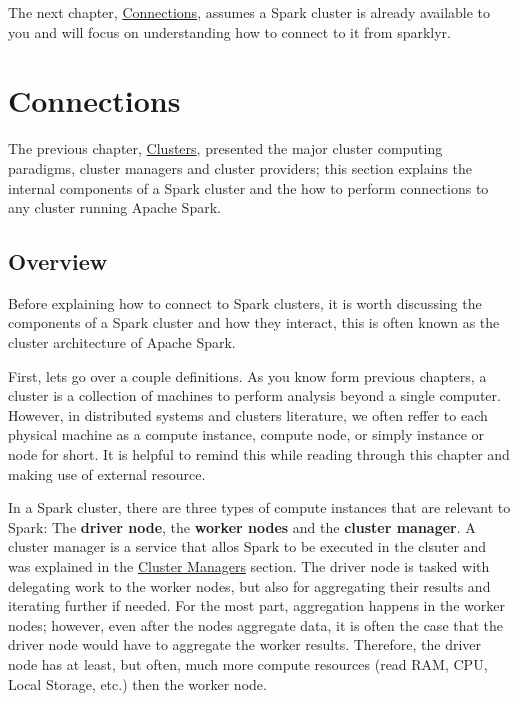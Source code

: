 \documentclass[]{book}
\theoremstyle{definition}
\theoremstyle{definition}
\theoremstyle{definition}
\theoremstyle{remark}
\begin{document}
The next chapter, \protect\hyperlink{connections-1}{Connections},
assumes a Spark cluster is already available to you and will focus on
understanding how to connect to it from sparklyr.

\hypertarget{connections}{%
\chapter{Connections}\label{connections}}

The previous chapter, \protect\hyperlink{clusters}{Clusters}, presented
the major cluster computing paradigms, cluster managers and cluster
providers; this section explains the internal components of a Spark
cluster and the how to perform connections to any cluster running Apache
Spark.

\hypertarget{overview-2}{%
\section{Overview}\label{overview-2}}

Before explaining how to connect to Spark clusters, it is worth
discussing the components of a Spark cluster and how they interact, this
is often known as the cluster architecture of Apache Spark.

First, lets go over a couple definitions. As you know form previous
chapters, a cluster is a collection of machines to perform analysis
beyond a single computer. However, in distributed systems and clusters
literature, we often reffer to each physical machine as a compute
instance, compute node, or simply instance or node for short. It is
helpful to remind this while reading through this chapter and making use
of external resource.

In a Spark cluster, there are three types of compute instances that are
relevant to Spark: The \textbf{driver node}, the \textbf{worker nodes}
and the \textbf{cluster manager}. A cluster manager is a service that
allos Spark to be executed in the clsuter and was explained in the
\href{Managers}{Cluster Managers} section. The driver node is tasked
with delegating work to the worker nodes, but also for aggregating their
results and iterating further if needed. For the most part, aggregation
happens in the worker nodes; however, even after the nodes aggregate
data, it is often the case that the driver node would have to aggregate
the worker results. Therefore, the driver node has at least, but often,
much more compute resources (read RAM, CPU, Local Storage, etc.) then
the worker node.
\end{document}
